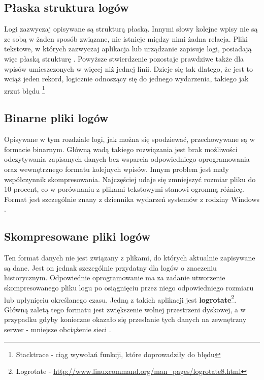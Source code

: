     \subsection{Płaska struktura logów}
    Logi zazwyczaj opisywane są strukturą płaską. Innymi słowy kolejne wpisy nie są ze sobą w żaden sposób
    związane, nie istnieje między nimi żadna relacja. Pliki tekstowe, w których zazwyczaj aplikacja lub
    urządzanie zapisuje logi, posiadają więc płaską strukturę \cite{logging_log_management}. Powyższe stwierdzenie
    pozostaje prawdziwe także dla wpisów umieszczonych w więcej niż jednej linii. Dzieje się tak dlatego, że
    jest to wciąż jeden rekord, logicznie odnoszący się do jednego wydarzenia, takiego jak zrzut błędu
    \footnote{Stacktrace - ciąg wywołań funkcji, które doprowadziły do błędu}
    
    \subsection{Binarne pliki logów}
    Opisywane w tym rozdziale logi, jak można się spodziewać, przechowywane są w formacie binarnym. Główną wadą takiego
    rozwiązania jest brak możliwości odczytywania zapisanych danych bez wsparcia odpowiedniego
    oprogramowania oraz wewnętrznego formatu kolejnych wpisów. Innym problem jest mały współczynnik
    skompresowania. Najczęściej udaje się zmniejszyć rozmiar pliku do 10 procent, co w
    porównaniu z plikami tekstowymi stanowi ogromną różnicę.
    Format jest szczególnie znany z dziennika wydarzeń systemów z rodziny Windows \cite{logging_log_management}.
    
    \subsection{Skompresowane pliki logów}
    \label{chapter:logs:history:compressed_log_format}
    Ten format danych nie jest związany z plikami, do których aktualnie zapisywane są dane.
    Jest on jednak szczególnie przydatny dla logów o znaczeniu historycznym. Odpowiednie
    oprogramowanie ma za zadanie utworzenie skompresowanego pliku logu po osiągnięciu przez niego
    odpowiedniego rozmiaru lub upłynięciu określanego czasu. Jedną z takich aplikacji jest 
    \textbf{logrotate}\footnote{Logrotate - \url{http://www.linuxcommand.org/man_pages/logrotate8.html}}.
    Główną zaletą tego formatu jest zwiększenie wolnej przestrzeni dyskowej, a w przypadku gdyby konieczne
    okazało się przesłanie tych danych na zewnętrzny serwer - mniejsze obciążenie sieci \cite{logging_log_management}.
 
